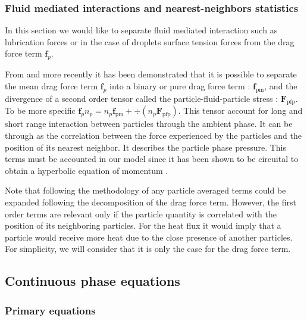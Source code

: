 \subsubsection{Fluid mediated interactions and nearest-neighbors statistics}

In this section we would like to separate fluid mediated interaction such as lubrication forces or in the case of droplets surface tension forces from the drag force term $\textbf{f}_p$.  

From \citet{nott2011suspension} and more recently \citet{zhang2021ensemble} it has been demonstrated that it is possible to separate the mean drag force term $\textbf{f}_p$ into a binary or pure drag force term : $\textbf{f}_\text{pm}$, and the divergence of a second order tensor called the particle-fluid-particle stress : $\textbf{F}_\text{pfp}$. 
To be more specific $\textbf{f}_p n_p  = n_p \textbf{f}_\text{pm} + \div (n_p \textbf{F}_\text{pfp})$. 
This tensor account for long and short range interaction between particles through the ambient phase. 
It can be through as the correlation between the force experienced by the particles and the position of its nearest neighbor. 
It describes the particle phase pressure. 
This terms must be accounted in our model since it has been shown to be circuital to obtain a hyperbolic equation of momentum \citep{fox2020hyperbolic}. 

Note that following the methodology of \citet{zhang2021ensemble} any particle averaged terms could be expanded following the decomposition of the drag force term. 
However, the first order terms are relevant only if the particle quantity is correlated with the position of its neighboring particles.  
For the heat flux it would imply that a particle would receive more heat due to the close presence of another particles. 
For simplicity, we will consider that it is only the case for the drag force term. 

\subsection{Continuous phase equations}


\subsubsection{Primary equations}

